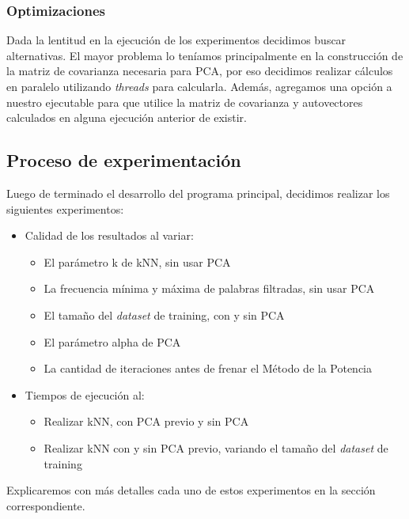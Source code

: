 \subsubsection{Optimizaciones}
Dada la lentitud en la ejecución de los experimentos decidimos buscar alternativas. El mayor problema lo teníamos principalmente en la construcción de la matriz de covarianza necesaria para PCA,  por eso decidimos realizar cálculos en paralelo utilizando \textit{threads} para calcularla. Además, agregamos una opción a nuestro ejecutable para que utilice la matriz de covarianza y autovectores calculados en alguna ejecución anterior de existir.


\subsection{Proceso de experimentación}
Luego de terminado el desarrollo del programa principal,
decidimos realizar los siguientes experimentos:

\begin{itemize}
	\item Calidad de los resultados al variar:
	\begin{itemize}
		\item El parámetro k de kNN, sin usar PCA
		\item La frecuencia mínima y máxima de palabras filtradas, sin usar PCA
		\item El tamaño del \textit{dataset} de training, con y sin PCA
		\item El parámetro alpha de PCA
		\item La cantidad de iteraciones antes de frenar el Método de la Potencia
	\end{itemize}
	\item Tiempos de ejecución al:
	\begin{itemize}
		\item Realizar kNN, con PCA previo y sin PCA
		\item Realizar kNN con y sin PCA previo, variando el tamaño del \textit{dataset} de training
	\end{itemize}
\end{itemize}

Explicaremos con más detalles cada uno de estos experimentos en la sección correspondiente.

